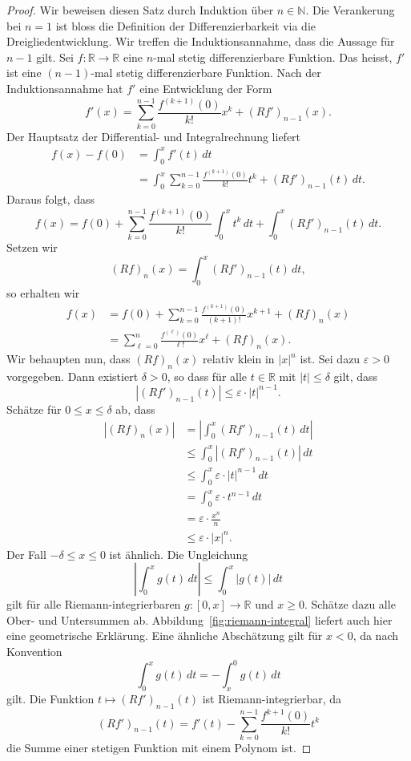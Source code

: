 \documentclass[../main.tex]{subfiles}
\begin{document}
\begin{proof}
  Wir beweisen diesen Satz durch Induktion über $n \in \mathbb{N}$.
  Die Verankerung bei $n = 1$ ist bloss die Definition der Differenzierbarkeit
  via die Dreigliedentwicklung.
  Wir treffen die Induktionsannahme, dass die Aussage für $n-1$ gilt.
  Sei $f \colon \mathbb{R} \to \mathbb{R}$ eine $n$-mal stetig differenzierbare Funktion.
  Das heisst, $f'$ ist eine $(n-1)$-mal stetig differenzierbare Funktion.
  Nach der Induktionsannahme hat $f'$ eine Entwicklung der Form
  \[
    f'(x) = \sum_{k=0}^{n-1} \frac{f^{(k+1)}(0)}{k!}x^k + {(Rf')}_{n-1}(x).
  \]
  Der Hauptsatz der Differential- und Integralrechnung liefert
  \begin{align*}
    f(x) - f(0) & = \int_{0}^{x} f'(t) \, dt \\
                & = \int_{0}^{x} \sum_{k=0}^{n-1} \frac{f^{(k+1)}(0)}{k!}t^k
                + {(Rf')}_{n-1}(t)\, dt.
  \end{align*}
  Daraus folgt, dass
  \[
    f(x) = f(0) + \sum_{k=0}^{n-1} \frac{f^{(k+1)}(0)}{k!} \int_{0}^{x} t^k \, dt
    + \int_{0}^{x} {(Rf')}_{n-1}(t) \, dt.
  \]
  Setzen wir
  \[
    {(Rf)}_n(x) = \int_{0}^{x} {(Rf')}_{n-1}(t) \, dt,
  \]
  so erhalten wir
  \begin{align*}
    f(x) & = f(0) + \sum_{k=0}^{n-1} \frac{f^{(k+1)}(0)}{(k+1)!}x^{k+1} + {(Rf)}_n(x) \\
         & = \sum_{\ell=0}^{n} \frac{f^{(\ell)}(0)}{\ell!}x^{\ell} + {(Rf)}_n(x).
  \end{align*}
  Wir behaupten nun, dass ${(Rf)}_n(x)$ relativ klein in $|x|^n$ ist.
  Sei dazu $\varepsilon > 0$ vorgegeben. Dann existiert $\delta > 0$,
  so dass für alle $t \in \mathbb{R}$ mit $|t| \leq \delta$ gilt,
  dass
  \[
    |{(Rf')}_{n-1}(t)| \leq \varepsilon \cdot |t|^{n-1}.
  \]
  Schätze für $0 \leq x \leq \delta$ ab, dass
  \begin{align*}
    |{(Rf)}_n(x)| 
    &= \left| \int_{0}^{x} {(Rf')}_{n-1}(t) \, dt \right|  \\
    &\leq \int_{0}^{x} |{(Rf')}_{n-1}(t)| \, dt \\
    &\leq \int_{0}^{x} \varepsilon \cdot |t|^{n-1} \, dt \\
    &= \int_{0}^{x} \varepsilon \cdot t^{n-1} \, dt \\
    &= \varepsilon \cdot \frac{x^n}{n} \\
    &\leq \varepsilon \cdot |x|^n.
  \end{align*}
  Der Fall $-\delta \leq x \leq 0$ ist ähnlich.
  Die Ungleichung
  \[
    \left| \int_{0}^{x} g(t) \, dt \right| \leq \int_{0}^{x} |g(t)| \, dt
  \]
  gilt für alle Riemann-integrierbaren $g \colon [0, x] \to \mathbb{R}$
  und $x \geq 0$.
  Schätze dazu alle Ober- und Untersummen ab.
  Abbildung~\ref{fig:riemann-integral} liefert auch hier eine geometrische Erklärung.
  Eine ähnliche Abschätzung gilt für $x < 0$, da nach Konvention
  \[
    \int_{0}^{x} g(t) \, dt = - \int_{x}^{0} g(t) \, dt
  \]
  gilt.
  Die Funktion $t \mapsto {(Rf')}_{n-1}(t)$ ist Riemann-integrierbar, da
  \[
    {(Rf')}_{n-1}(t) = f'(t) - \sum_{k=0}^{n-1} \frac{f^{k+1}(0)}{k!}t^k
  \]
  die Summe einer stetigen Funktion mit einem Polynom ist.
\end{proof}
\end{document}
